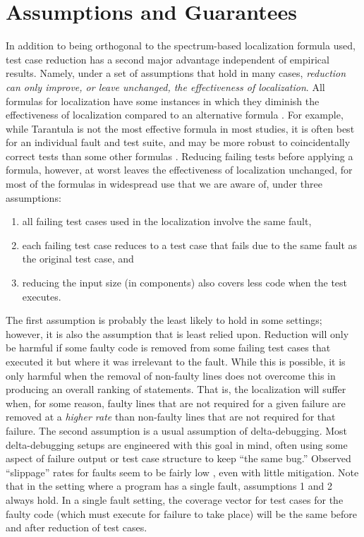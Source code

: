 \section{Assumptions and Guarantees}
\label{formal}

In addition to being orthogonal to the spectrum-based localization
formula used, test case reduction has a second major advantage
independent of empirical results.  Namely, under a set of assumptions
that hold in many cases, \emph{reduction can only improve, or leave
unchanged, the effectiveness of localization}.  All formulas for
localization have some instances in which they diminish the
effectiveness of localization compared to an alternative formula
\cite{yoo2014no}. For example, while Tarantula is not the most
effective formula in most studies, it is often best for an
individual fault and test suite, and may be more robust to
coincidentally correct tests than some other formulas \cite{CCT}.
Reducing failing tests before applying a formula, however, at worst
leaves the effectiveness of localization unchanged, for most of the
formulas in widespread use that we are aware of, under three
assumptions:

\begin{enumerate}
\item all failing test cases used in the localization involve the same
fault,
\item each failing test case reduces to a test case that fails due to the same fault as the original test case, and
\item reducing the input size (in components) also covers less code when the test executes.
\end{enumerate}

The first assumption is probably the least likely to hold in some
settings; however, it is also the assumption that is least relied
upon.  Reduction will only be harmful if some faulty code is removed
from some failing test cases that executed it but where it was
irrelevant to the fault.  While this is possible, it is only harmful
when the removal of non-faulty lines does not overcome this in
producing an overall ranking of statements.  That is, the localization
will suffer when, for some reason, faulty lines that are not required
for a given failure are removed at a \emph{higher rate} than non-faulty lines
that are not required for that failure.  The second assumption is a usual assumption of delta-debugging.  Most
delta-debugging setups are engineered with this goal in mind, often
using some aspect of failure output or test case structure to keep
``the same bug.''  Observed ``slippage'' rates for faults
seem to be fairly low \cite{PLDI13}, even with little mitigation.
Note that in the setting where a program has a single fault,
assumptions 1 and 2 always hold.  In a single fault setting, the
coverage vector for test cases for the faulty code (which must execute
for failure to take place) will be the same before and after reduction
of test cases.

